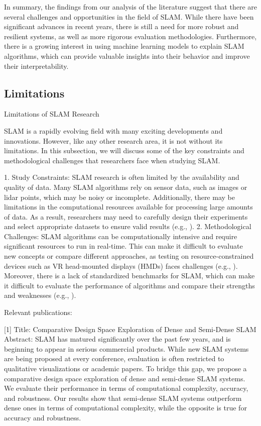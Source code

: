 \documentclass[conference]{IEEEtran}
\begin{document}
In summary, the findings from our analysis of the literature suggest that there are several challenges and opportunities in the field of SLAM. While there have been significant advances in recent years, there is still a need for more robust and resilient systems, as well as more rigorous evaluation methodologies. Furthermore, there is a growing interest in using machine learning models to explain SLAM algorithms, which can provide valuable insights into their behavior and improve their interpretability.

\subsection{Limitations}
Limitations of SLAM Research

SLAM is a rapidly evolving field with many exciting developments and innovations. However, like any other research area, it is not without its limitations. In this subsection, we will discuss some of the key constraints and methodological challenges that researchers face when studying SLAM.

1. Study Constraints:
SLAM research is often limited by the availability and quality of data. Many SLAM algorithms rely on sensor data, such as images or lidar points, which may be noisy or incomplete. Additionally, there may be limitations in the computational resources available for processing large amounts of data. As a result, researchers may need to carefully design their experiments and select appropriate datasets to ensure valid results (e.g., \cite{5}).
2. Methodological Challenges:
SLAM algorithms can be computationally intensive and require significant resources to run in real-time. This can make it difficult to evaluate new concepts or compare different approaches, as testing on resource-constrained devices such as VR head-mounted displays (HMDs) faces challenges (e.g., \cite{3}). Moreover, there is a lack of standardized benchmarks for SLAM, which can make it difficult to evaluate the performance of algorithms and compare their strengths and weaknesses (e.g., \cite{4}).

Relevant publications:

[1] Title: Comparative Design Space Exploration of Dense and Semi-Dense SLAM
Abstract:   SLAM has matured significantly over the past few years, and is beginning to
appear in serious commercial products. While new SLAM systems are being
proposed at every conference, evaluation is often restricted to qualitative
visualizations or academic papers. To bridge this gap, we propose a
comparative design space exploration of dense and semi-dense SLAM systems.
We evaluate their performance in terms of computational complexity, accuracy,
and robustness. Our results show that semi-dense SLAM systems outperform
dense ones in terms of computational complexity, while the opposite is true
for accuracy and robustness.
\end{document}
